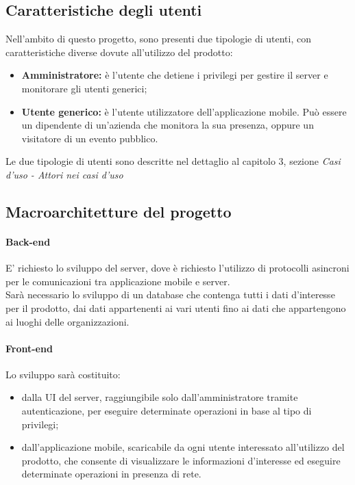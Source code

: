 \documentclass[../analisi-dei-requisiti]{subfiles}
\begin{document}
\subsection{Caratteristiche degli utenti}%
\label{sub:caratteristiche_degli_utenti}
Nell'ambito di questo progetto, sono presenti due tipologie di utenti, con caratteristiche diverse dovute all'utilizzo del prodotto:
\begin{itemize}
  \item \textbf{Amministratore:} è l'utente che detiene i privilegi per gestire il server e monitorare gli utenti generici;
  \item \textbf{Utente generico:} è l'utente utilizzatore dell'applicazione mobile. Può essere un dipendente di un'azienda che monitora la sua presenza, oppure
  un visitatore di un evento pubblico.
\end{itemize}
Le due tipologie di utenti sono descritte nel dettaglio al capitolo 3, sezione \emph{Casi d'uso - Attori nei casi d'uso}

\subsection{Macroarchitetture del progetto}%
\label{sub:macroarchitetture_del_progetto}
\paragraph{Back-end}%
\label{par:back-end}
E' richiesto lo sviluppo  del server, dove è richiesto l'utilizzo di protocolli asincroni per le comunicazioni tra applicazione mobile e server.\\
Sarà necessario lo sviluppo di un database che contenga tutti i dati d'interesse per il prodotto, dai dati appartenenti ai vari utenti fino ai dati che appartengono ai
luoghi delle organizzazioni.
\paragraph{Front-end}%
\label{par:front-end}
Lo sviluppo  sarà costituito:
\begin{itemize}
  \item dalla UI del server, raggiungibile solo dall'amministratore tramite autenticazione, per eseguire determinate operazioni in base al tipo di privilegi;
  \item dall'applicazione mobile, scaricabile da ogni utente interessato all'utilizzo del prodotto, che consente di visualizzare le informazioni d'interesse ed eseguire determinate
  operazioni in presenza di rete.
\end{itemize}

\end{document}
